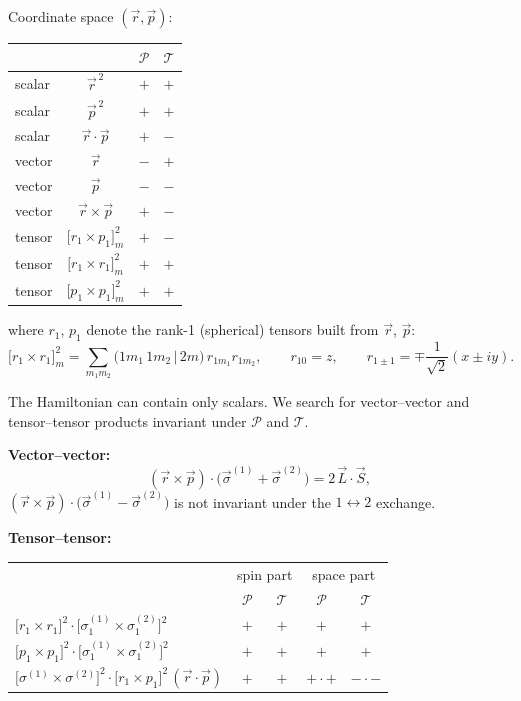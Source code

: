\documentclass[11pt,a4paper]{article}
\begin{document}
Coordinate space $(\vec r,\vec p)$:
\begin{center}
\renewcommand{\arraystretch}{1.3}
\begin{tabular}{l c c c}
\hline
 & & $\mathcal P$ & $\mathcal T$ \\
\hline
scalar & $\vec r^{\,2}$ & $+$ & $+$ \\
scalar & $\vec p^{\,2}$ & $+$ & $+$ \\
scalar & $\vec r\cdot\vec p$ & $+$ & $-$ \\
vector & $\vec r$ & $-$ & $+$ \\
vector & $\vec p$ & $-$ & $-$ \\
vector & $\vec r\times\vec p$ & $+$ & $-$ \\
tensor & $\big[r_1\times p_1\big]^2_m$ & $+$ & $-$ \\
tensor & $\big[r_1\times r_1\big]^2_m$ & $+$ & $+$ \\
tensor & $\big[p_1\times p_1\big]^2_m$ & $+$ & $+$ \\
\hline
\end{tabular}
\end{center}
where $r_1$, $p_1$ denote the rank-1 (spherical) tensors built from $\vec r$, $\vec p$:
\[
\big[r_1\times r_1\big]^2_m=\sum_{m_1m_2}\big(1m_1\,1m_2\,|\,2m\big)\,r_{1m_1}r_{1m_2},
\qquad
r_{10}=z,\qquad r_{1\pm1}=\mp\frac{1}{\sqrt2}(x\pm iy).
\]

The Hamiltonian can contain only scalars. We search for vector--vector and
tensor--tensor products invariant under $\mathcal P$ and $\mathcal T$.

\textbf{Vector--vector:}
\[
(\vec r\times\vec p)\cdot\big(\vec\sigma^{(1)}+\vec\sigma^{(2)}\big)=2\,\vec L\cdot\vec S ,
\]
$(\vec r\times\vec p)\cdot\big(\vec\sigma^{(1)}-\vec\sigma^{(2)}\big)$ is not
invariant under the $1\leftrightarrow2$ exchange.

\textbf{Tensor--tensor:}
\begin{center}
\renewcommand{\arraystretch}{1.3}
\begin{tabular}{l c c c c}
\hline
 & \multicolumn{2}{c}{spin part} & \multicolumn{2}{c}{space part}\\
 & $\mathcal P$ & $\mathcal T$ & $\mathcal P$ & $\mathcal T$ \\
\hline
$\big[r_1\times r_1\big]^2\cdot\big[\sigma^{(1)}_1\times\sigma^{(2)}_1\big]^2$ & $+$ & $+$ & $+$ & $+$ \\
$\big[p_1\times p_1\big]^2\cdot\big[\sigma^{(1)}_1\times\sigma^{(2)}_1\big]^2$ & $+$ & $+$ & $+$ & $+$ \\
$\big[\sigma^{(1)}\times\sigma^{(2)}\big]^2\cdot\big[r_1\times p_1\big]^2\,(\vec r\cdot\vec p)$ & $+$ & $+$ & $+$\,$\cdot$\,$+$ & $-$\,$\cdot$\,$-$ \\
\hline
\end{tabular}
\end{center}
\end{document}
